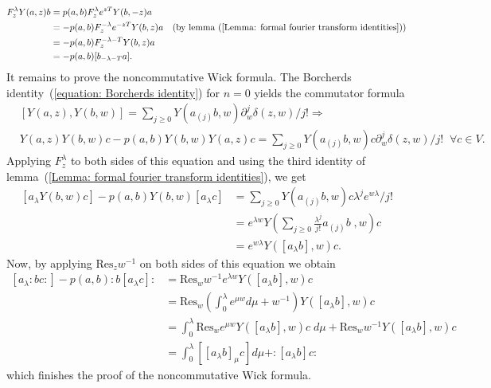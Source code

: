 \begin{equation}
    \begin{split}
        F_z^\lambda Y(a,z)b &= p(a,b)F_z^\lambda e^{zT}Y(b,-z)a\\
        &=-p(a,b)F_z^{-\lambda}e^{-zT}Y(b,z)a\quad(\text{by lemma~(\ref{Lemma: formal fourier transform identities})})\\
        &=-p(a,b)F_z^{-\lambda-T}Y(b,z)a\\
        &=-p(a,b)[b_{-\lambda-T}a].
    \end{split}
\end{equation}
It remains to prove the noncommutative Wick formula. The Borcherds identity~(\ref{equation: Borcherds identity}) for $n=0$ yields the commutator formula
\begin{equation}
\begin{split}
     &[Y(a,z),Y(b,w)]=\sum_{j\geq0}Y(a_{(j)}b,w)\partial_w^j\delta(z,w)/j!\Rightarrow\\
     &Y(a,z)Y(b,w)c-p(a,b)Y(b,w)Y(a,z)c=\sum_{j\geq0}Y(a_{(j)}b,w)c\partial_w^j\delta(z,w)/j!\;\;\forall c\in V.
\end{split}
\end{equation}
Applying $F_z^\lambda$ to both sides of this equation and using the third identity of lemma~(\ref{Lemma: formal fourier transform identities}), we get
\begin{equation}
\begin{split}
    [a_\lambda Y(b,w)c]-p(a,b)Y(b,w)[a_\lambda c]&=\sum_{j\geq0}Y(a_{(j)}b,w)c\lambda^je^{w\lambda}/j!\\
    &=e^{\lambda w}Y\left(\sum_{j\geq0}\frac{\lambda^j}{j!}a_{(j)}b\;,w\right)c\\
    &=e^{w\lambda}Y([a_\lambda b],w)c.
\end{split}
\end{equation}
Now, by applying $\text{Res}_z w^{-1}$ on both sides of this equation we obtain
\begin{equation}
\begin{split}
    [a_\lambda :bc:]-p(a,b):b[a_\lambda c]: &= \text{Res}_ww^{-1}e^{\lambda w}Y([a_\lambda b],w)c\\
    &=\text{Res}_w\left(\int_0^\lambda e^{\mu w}d\mu + w^{-1}\right)Y([a_\lambda b],w)c\\
    &=\int_0^\lambda \text{Res}_we^{\mu w}Y([a_\lambda b],w)c\;d\mu+\text{Res}_ww^{-1}Y([a_\lambda b],w)c\\
    &=\int_0^\lambda [[a_\lambda b]_\mu c]d\mu +:[a_\lambda b]c:
\end{split}
\end{equation}
which finishes the proof of the noncommutative Wick formula.

